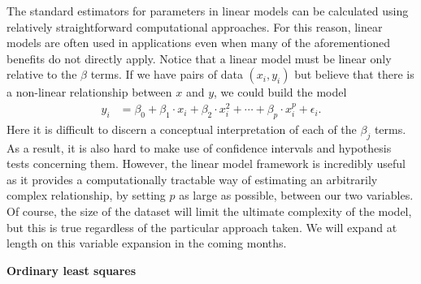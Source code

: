 \documentclass[12pt,hidelinks]{article}
\numberwithin{equation}{section}
\begin{document}
The standard estimators for
parameters in linear models can be calculated using relatively straightforward
computational approaches. For this reason, linear models
are often used in applications even when many of the aforementioned
benefits do not directly apply. Notice that a linear model must be
linear only relative to the $\beta$ terms. If we have pairs of data
$(x_i, y_i)$ but believe that there is a non-linear relationship
between $x$ and $y$, we could build the model
\begin{align}
y_i &= \beta_0 + \beta_1 \cdot x_i + \beta_2 \cdot x_i^2 + \cdots + \beta_p \cdot x_i^p + \epsilon_i.
\end{align}
Here it is difficult to discern a conceptual interpretation of each
of the $\beta_j$ terms. As a result, it is also hard to make use of
confidence intervals and hypothesis tests concerning them. However,
the linear model framework is incredibly useful as it provides a
computationally tractable way of estimating an arbitrarily complex
relationship, by setting $p$ as large as possible, between our two
variables. Of course, the size of the dataset will limit the ultimate
complexity of the model, but this is true regardless of the particular
approach taken. We will expand at length on this variable expansion
in the coming months.

\textbf{Ordinary least squares}
\end{document}
